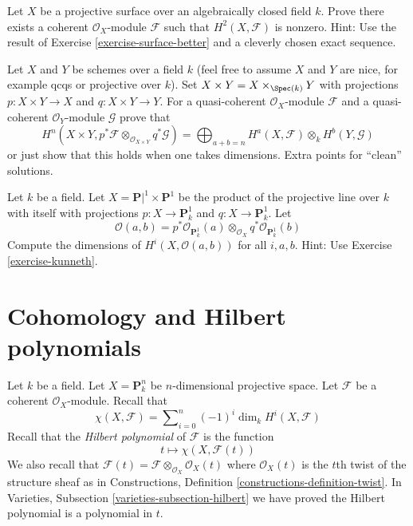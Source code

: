 \begin{exercise}
\label{exercise-surface-h2-nonzero}
Let $X$ be a projective surface over an algebraically closed field $k$.
Prove there exists a coherent $\mathcal{O}_X$-module $\mathcal{F}$
such that $H^2(X, \mathcal{F})$ is nonzero. Hint: Use the result
of Exercise \ref{exercise-surface-better} and a cleverly chosen
exact sequence.
\end{exercise}

\begin{exercise}
\label{exercise-kunneth}
Let $X$ and $Y$ be schemes over a field $k$ (feel free to assume
$X$ and $Y$ are nice, for example qcqs or projective over $k$).
Set $X \times Y = X \times_{\Spec(k)} Y$ with projections
$p : X \times Y \to X$ and $q : X \times Y \to Y$. For
a quasi-coherent $\mathcal{O}_X$-module $\mathcal{F}$ and
a quasi-coherent $\mathcal{O}_Y$-module $\mathcal{G}$ prove that
$$
H^n(X \times Y,
p^*\mathcal{F} \otimes_{\mathcal{O}_{X \times Y}} q^*\mathcal{G}) =
\bigoplus\nolimits_{a + b = n}
H^a(X, \mathcal{F}) \otimes_k H^b(Y, \mathcal{G})
$$
or just show that this holds when one takes dimensions.
Extra points for ``clean'' solutions.
\end{exercise}

\begin{exercise}
\label{exercise-Oab}
Let $k$ be a field. Let $X = \mathbf{P}|^1 \times \mathbf{P}^1$
be the product of the projective line over $k$ with itself
with projections $p : X \to \mathbf{P}^1_k$ and $q : X \to \mathbf{P}^1_k$.
Let
$$
\mathcal{O}(a, b) = p^*\mathcal{O}_{\mathbf{P}^1_k}(a)
\otimes_{\mathcal{O}_X} q^*\mathcal{O}_{\mathbf{P}^1_k}(b)
$$
Compute the dimensions of $H^i(X, \mathcal{O}(a, b))$
for all $i, a, b$. Hint: Use Exercise \ref{exercise-kunneth}.
\end{exercise}










\section{Cohomology and Hilbert polynomials}
\label{section-cohomology-hilbert-polynomials}

\begin{situation}
\label{situation-hilbert-polynomial}
Let $k$ be a field. Let $X = \mathbf{P}^n_k$ be
$n$-dimensional projective space. Let $\mathcal{F}$
be a coherent $\mathcal{O}_X$-module. Recall that
$$
\chi(X, \mathcal{F}) =
\sum\nolimits_{i = 0}^n (-1)^i \dim_k H^i(X, \mathcal{F})
$$
Recall that the {\it Hilbert polynomial} of $\mathcal{F}$ is the function
$$
t \longmapsto \chi(X, \mathcal{F}(t))
$$
We also recall that
$\mathcal{F}(t) = \mathcal{F} \otimes_{\mathcal{O}_X} \mathcal{O}_X(t)$
where $\mathcal{O}_X(t)$ is the $t$th twist of the structure sheaf
as in Constructions, Definition \ref{constructions-definition-twist}.
In Varieties, Subsection \ref{varieties-subsection-hilbert} we have
proved the Hilbert polynomial is a polynomial in $t$.
\end{situation}

